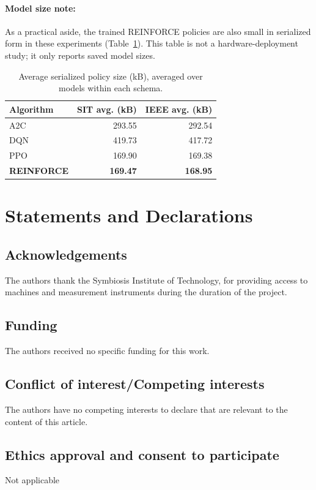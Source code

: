 \documentclass[sn-basic]{sn-jnl}%
\begin{document}
\paragraph{Model size note:}
As a practical aside, the trained \textsc{REINFORCE} policies are also small in serialized form in these experiments (Table~\ref{tab:model_size_summary}). This table is not a hardware-deployment study; it only reports saved model sizes.

\begin{table}[htbp]
\centering
\caption{Average serialized policy size (kB), averaged over models within each schema.}
\label{tab:model_size_summary}
\begin{tabular}{l r r}
\toprule
	\textbf{Algorithm} & \textbf{SIT avg. (kB)} & \textbf{IEEE avg. (kB)}\\
	\midrule
	A2C & 293.55 & 292.54\\
	DQN & 419.73 & 417.72\\
	PPO & 169.90 & 169.38\\
	\textbf{REINFORCE} & \textbf{169.47} & \textbf{168.95}\\
\bottomrule
\end{tabular}
\end{table}


\section*{Statements and Declarations}

\subsection*{Acknowledgements}
The authors thank the Symbiosis Institute of Technology, for providing access to machines and measurement instruments during the duration of the project.

\subsection*{Funding}
The authors received no specific funding for this work.

\subsection*{Conflict of interest/Competing interests}
The authors have no competing interests to declare that are relevant to the content of this article.

\subsection*{Ethics approval and consent to participate}
Not applicable
\end{document}
